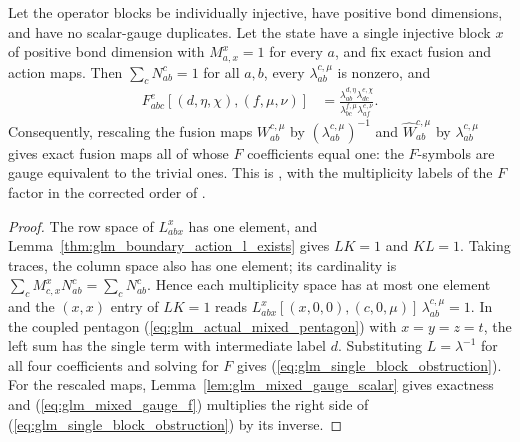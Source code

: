 \begin{theorem}
    \leanok
    \label{thm:glm_single_block_obstruction}
    Let the operator blocks be individually injective, have positive bond
    dimensions, and have no scalar-gauge duplicates. Let the state have a
    single injective block $x$ of positive bond dimension with $M_{a,x}^x=1$
    for every $a$, and fix exact fusion and action maps. Then
    $\sum_cN_{ab}^c=1$ for all $a,b$, every $\lambda_{ab}^{c,\mu}$ is
    nonzero, and
    \begin{align}
        F_{abc}^{e}[(d,\eta,\chi),(f,\mu,\nu)]
         & =\frac{\lambda_{ab}^{d,\eta}\lambda_{dc}^{e,\chi}}
        {\lambda_{bc}^{f,\mu}\lambda_{af}^{e,\nu}}.
        \label{eq:glm_single_block_obstruction}
    \end{align}
    Consequently, rescaling the fusion maps $W_{ab}^{c,\mu}$ by
    $(\lambda_{ab}^{c,\mu})^{-1}$ and $\widehat W_{ab}^{c,\mu}$ by
    $\lambda_{ab}^{c,\mu}$ gives exact fusion maps all of whose $F$
    coefficients equal one: the $F$-symbols are gauge equivalent to the
    trivial ones. This is \cite[Section~3.2]{GarreRubio2023MPOSym}, with the
    multiplicity labels of the $F$ factor in the corrected order of
    \cite{gap:glm23_multiplicity_l_indices}.
\end{theorem}
\begin{proof}
    \leanok
    The row space of $L_{abx}^{x}$ has one element, and
    Lemma~\ref{thm:glm_boundary_action_l_exists} gives $LK=1$ and $KL=1$.
    Taking traces, the column space also has one element; its cardinality is
    $\sum_cM_{c,x}^xN_{ab}^c=\sum_cN_{ab}^c$. Hence each multiplicity space
    has at most one element and the $(x,x)$ entry of $LK=1$ reads
    $L_{abx}^x[(x,0,0),(c,0,\mu)]\,\lambda_{ab}^{c,\mu}=1$.
    In the coupled pentagon (\ref{eq:glm_actual_mixed_pentagon}) with
    $x=y=z=t$, the left sum has the single term with intermediate label
    $d$. Substituting $L=\lambda^{-1}$ for all four coefficients and solving
    for $F$ gives (\ref{eq:glm_single_block_obstruction}). For the rescaled
    maps, Lemma~\ref{lem:glm_mixed_gauge_scalar} gives exactness and
    (\ref{eq:glm_mixed_gauge_f}) multiplies the right side of
    (\ref{eq:glm_single_block_obstruction}) by its inverse.
\end{proof}

